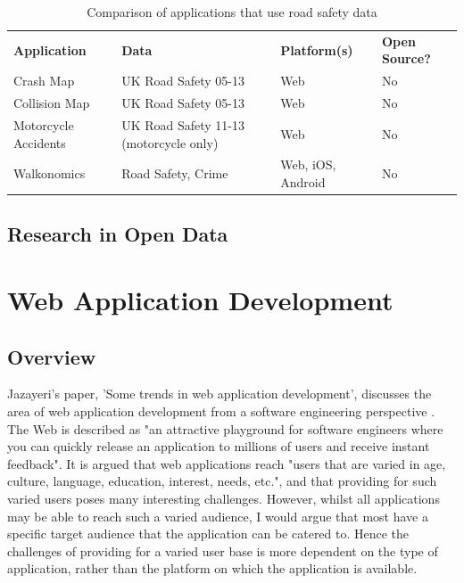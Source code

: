 \documentclass[authoryearcitations]{UoYCSproject}
\begin{document}
\begin{table}[tbp]
  \centering
  \begin{tabular}{ p{2.5cm}  p{3.2cm}  p{2.2cm}  p{2.2cm} }
      \textbf{Application} & \textbf{Data} & \textbf{Platform(s)} & \textbf{Open Source?} 
    \\Crash Map & UK Road Safety 05-13 & Web & No
	\\Collision Map & UK Road Safety 05-13 & Web & No
	\\Motorcycle Accidents & UK Road Safety 11-13 (motorcycle only) & Web & No
	\\Walkonomics & Road Safety, Crime & Web, iOS, Android & No
  \end{tabular}
  \caption{Comparison of applications that use road safety data}
  \label{tab:applications}
\end{table}

\subsection{Research in Open Data}

\section{Web Application Development}

\subsection{Overview}

Jazayeri's paper, 'Some trends in web application development', discusses the area of web application development from a software engineering perspective \citep{Jazayeri2007}. The Web is described as "an attractive playground for software engineers where you can quickly release an application to millions of users and receive instant feedback". It is argued that web applications reach "users that are varied in age, culture, language, education, interest, needs, etc.", and that providing for such varied users poses many interesting challenges. However, whilst all applications may be able to reach such a varied audience, I would argue that most have a specific target audience that the application can be catered to. Hence the challenges of providing for a varied user base is more dependent on the type of application, rather than the platform on which the application is available. 
\end{document}
